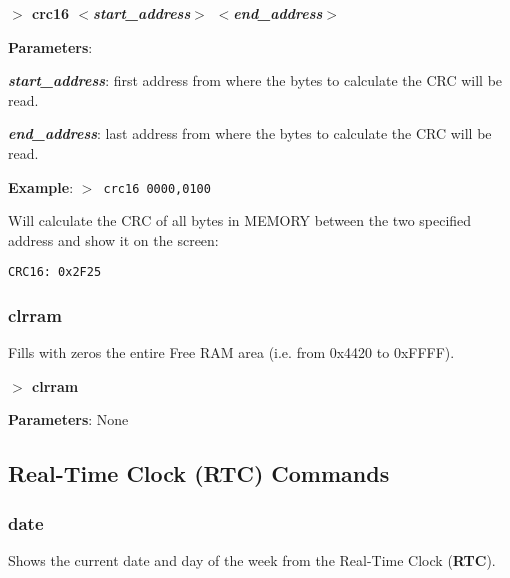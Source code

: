         \hspace{1.9cm}\textbf{$>$ crc16 \textit{$<$start\_address$>$
        $<$end\_address$>$}}
        
        \textbf{Parameters}:

        \hspace{1cm}\textbf{\textit{start\_address}}: first address from
        where the bytes to calculate the CRC will be read.

        \hspace{1cm}\textbf{\textit{end\_address}}: last address from where
        the bytes to calculate the CRC will be read.

        \textbf{Example}: \texttt{$>$ crc16 0000,0100}

        Will calculate the CRC of all bytes in MEMORY between the two
        specified address and show it on the screen:
        
        \hspace{1cm}\texttt{CRC16:\ 0x2F25}

        \subsubsection{{clrram}}
        Fills with zeros the entire Free RAM area (i.e. from 0x4420 to
        0xFFFF).

        \hspace{1.9cm}\textbf{$>$ clrram}

        \textbf{Parameters}: None

    \subsection{Real-Time Clock (RTC) Commands}
        \subsubsection{{date}}
        Shows the current date and day of the week from the Real-Time Clock
        (\textbf{RTC}).

